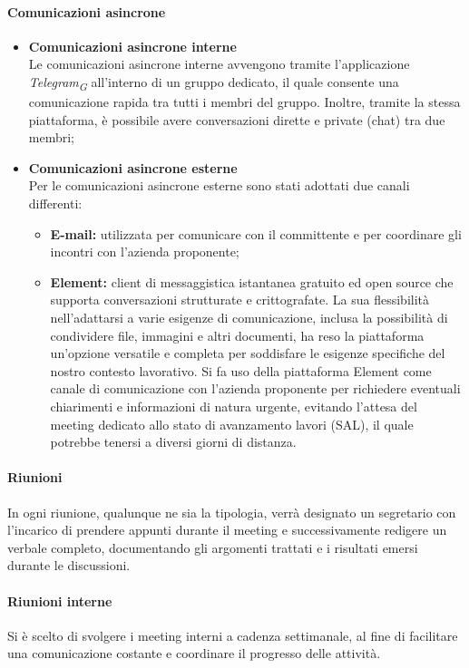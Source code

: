 \paragraph{Comunicazioni asincrone}
\begin{itemize}
  \item \textbf{Comunicazioni asincrone interne} \\
  Le comunicazioni asincrone interne avvengono tramite l'applicazione \textit{Telegram}\textsubscript{\textit{G}} all'interno di un gruppo dedicato, il quale consente una comunicazione rapida tra tutti i membri del gruppo. Inoltre, tramite la stessa piattaforma, è possibile avere conversazioni dirette e private (chat) tra due membri;
  
  \item \textbf{Comunicazioni asincrone esterne} \\
  Per le comunicazioni asincrone esterne sono stati adottati due canali differenti:
  \begin{itemize}
    \item \textbf{E-mail:} utilizzata per comunicare con il committente e per coordinare gli incontri con l'azienda proponente;
    \item \textbf{Element:} client di messaggistica istantanea gratuito ed open source che supporta conversazioni strutturate e crittografate. La sua flessibilità nell'adattarsi a varie esigenze di comunicazione, inclusa la possibilità di condividere file, immagini e altri documenti, ha reso la piattaforma un'opzione versatile e completa per soddisfare le esigenze specifiche del nostro contesto lavorativo. Si fa uso della piattaforma Element come canale di comunicazione con l'azienda proponente per richiedere eventuali chiarimenti e informazioni di natura urgente, evitando l'attesa del meeting dedicato allo stato di avanzamento lavori (SAL), il quale potrebbe tenersi a diversi giorni di distanza.
  \end{itemize}
\end{itemize}

\paragraph*{Riunioni}
In ogni riunione, qualunque ne sia la tipologia, verrà designato un segretario con l'incarico di prendere appunti durante il meeting e successivamente redigere un verbale completo, documentando gli argomenti trattati e i risultati emersi durante le discussioni.

\paragraph{Riunioni interne}
Si è scelto di svolgere i meeting interni a cadenza settimanale, al fine di facilitare una comunicazione costante e coordinare il progresso delle attività. \\

